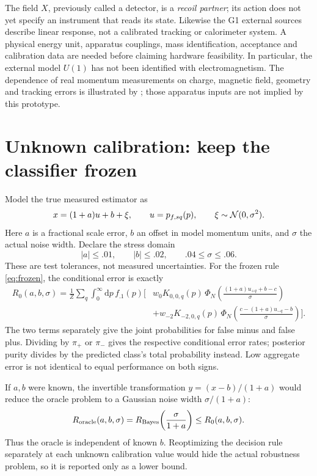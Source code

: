 \documentclass[11pt,a4paper]{article}
\newcommand{\dd}{\mathrm d}
\begin{document}
The field $X$, previously called a detector, is a \emph{recoil partner};
its action does not yet specify an instrument that reads its state.
Likewise the G1 external sources describe linear response, not a
calibrated tracking or calorimeter system. A physical energy unit,
apparatus couplings, mass identification, acceptance and calibration
data are needed before claiming hardware feasibility. In particular,
the external model $U(1)$ has not been identified with electromagnetism.
The dependence of real momentum measurements on charge, magnetic field,
geometry and tracking errors is illustrated by \cite{pdg}; those
apparatus inputs are not implied by this prototype.

\section{Unknown calibration: keep the classifier frozen}
Model the true measured estimator as
\begin{equation}
 x=(1+a)u+b+\xi,\qquad
 u=p_{f,sq}(p),\qquad \xi\sim{\cal N}(0,\sigma^2).
\end{equation}
Here $a$ is a fractional scale error, $b$ an offset in model momentum
units, and $\sigma$ the actual noise width. Declare the stress domain
\begin{equation}\label{eq:box}
 |a|\leq .01,\qquad |b|\leq .02,\qquad .04\leq\sigma\leq .06 .
\end{equation}
These are test tolerances, not measured uncertainties. For the frozen
rule \eqref{eq:frozen}, the conditional error is exactly
\begin{align}
 R_0(a,b,\sigma)=\frac1Z\sum_q\int_0^\infty\dd p\, f_{.1}(p)
 \bigg[&
 w_0K_{0,0,q}(p)\,
 \Phi_{\!N}\!\left(\frac{(1+a)u_{+q}+b-c}{\sigma}\right)\nonumber\\
 &+w_{-2}K_{-2,0,q}(p)\,
 \Phi_{\!N}\!\left(\frac{c-(1+a)u_{-q}-b}{\sigma}\right)\bigg].
 \label{eq:risk}
\end{align}
The two terms separately give the joint probabilities for false minus
and false plus. Dividing by $\pi_+$ or $\pi_-$ gives the respective
conditional error rates; posterior purity divides by the predicted
class's total probability instead. Low aggregate error is not identical
to equal performance on both signs.

If $a,b$ were known, the invertible transformation
$y=(x-b)/(1+a)$ would reduce the oracle problem to a Gaussian noise
width $\sigma/(1+a)$:
\begin{equation}
 R_{\rm oracle}(a,b,\sigma)
 =R_{\rm Bayes}\!\left(\frac{\sigma}{1+a}\right)
 \leq R_0(a,b,\sigma).
\end{equation}
Thus the oracle is independent of known $b$. Reoptimizing the decision
rule separately at each unknown calibration value would hide the
actual robustness problem, so it is reported only as a lower bound.
\end{document}
